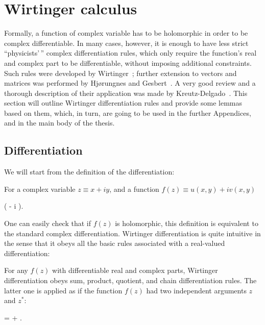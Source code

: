 \chapter{Wirtinger calculus}
\label{cha:appendix:c-numbers}

Formally, a function of complex variable has to be holomorphic in order to be complex differentiable.
In many cases, however, it is enough to have less strict ``physicists'\,'' complex differentiation rules, which only require the function's real and complex part to be differentiable, without imposing additional constraints.
Such rules were developed by Wirtinger~\cite{Wirtinger1927}; further extension to vectors and matrices was performed by Hj{\o}rungnes and Gesbert~\cite{Hjorungnes2007}.
A very good review and a thorough description of their application was made by Kreutz-Delgado~\cite{Kreutz-Delgado2009}.
This section will outline Wirtinger differentiation rules and provide some lemmas based on them, which, in turn, are going to be used in the further Appendices, and in the main body of the thesis.


\section{Differentiation}

We will start from the definition of the differentiation:

\begin{definition}
\label{def:c-numbers:wirtinger}
	For a complex variable $z \equiv x + iy$, and a function $f(z) \equiv u(x, y) + iv(x, y)$
	\begin{eqn*}
		\equiv {} \left(
			 - i 
		\right).
	\end{eqn*}
\end{definition}

One can easily check that if $f(z)$ is holomorphic, this definition is equivalent to the standard complex differentiation.
Wirtinger differentiation is quite intuitive in the sense that it obeys all the basic rules associated with a real-valued differentiation:

\begin{theorem}
\label{thm:c-numbers:diff-properties}
	For any $f(z)$ with differentiable real and complex parts, Wirtinger differentiation obeys sum, product, quotient, and chain differentiation rules.
	The latter one is applied as if the function $f(z)$ had two independent arguments $z$ and $z^*$:
	\begin{eqn*}
		\frac{\cwd f(g(z))}{\cwd z}
		=  \frac{\cwd g}{\cwd z}
			+  \frac{\cwd g^*}{\cwd z}.
	\end{eqn*}
\end{theorem}


